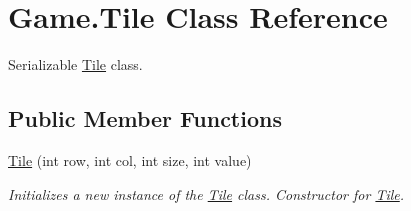 \hypertarget{class_game_1_1_tile}{}\section{Game.\+Tile Class Reference}
\label{class_game_1_1_tile}


Serializable \mbox{\hyperlink{class_game_1_1_tile}{Tile}} class.  


\subsection*{Public Member Functions}
\begin{DoxyCompactItemize}
\item 
\mbox{\hyperlink{class_game_1_1_tile_a2088c41dbe80db4e0ed84a2692309d17}{Tile}} (int row, int col, int size, int value)
\begin{DoxyCompactList}\small\item\em Initializes a new instance of the \mbox{\hyperlink{class_game_1_1_tile}{Tile}} class. Constructor for \mbox{\hyperlink{class_game_1_1_tile}{Tile}}. \end{DoxyCompactList}\end{DoxyCompactItemize}
